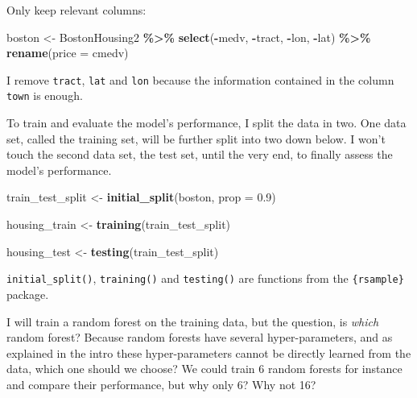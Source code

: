 \documentclass[
]{article}
\newenvironment{Shaded}{\begin{snugshade}}{\end{snugshade}}
\newcommand{\DataTypeTok}[1]{\textcolor[rgb]{0.13,0.29,0.53}{#1}}
\newcommand{\FloatTok}[1]{\textcolor[rgb]{0.00,0.00,0.81}{#1}}
\newcommand{\KeywordTok}[1]{\textcolor[rgb]{0.13,0.29,0.53}{\textbf{#1}}}
\newcommand{\NormalTok}[1]{#1}
\newcommand{\OperatorTok}[1]{\textcolor[rgb]{0.81,0.36,0.00}{\textbf{#1}}}
\newcommand{\StringTok}[1]{\textcolor[rgb]{0.31,0.60,0.02}{#1}}
\begin{document}
Only keep relevant columns:

\begin{Shaded}
\begin{Highlighting}[]
\NormalTok{boston \textless{}{-}}\StringTok{ }\NormalTok{BostonHousing2 }\OperatorTok{\%\textgreater{}\%}\StringTok{ }
\StringTok{    }\KeywordTok{select}\NormalTok{(}\OperatorTok{{-}}\NormalTok{medv, }\OperatorTok{{-}}\NormalTok{tract, }\OperatorTok{{-}}\NormalTok{lon, }\OperatorTok{{-}}\NormalTok{lat) }\OperatorTok{\%\textgreater{}\%}\StringTok{ }
\StringTok{    }\KeywordTok{rename}\NormalTok{(}\DataTypeTok{price =}\NormalTok{ cmedv)}
\end{Highlighting}
\end{Shaded}

I remove \texttt{tract}, \texttt{lat} and \texttt{lon} because the information contained in the column \texttt{town} is enough.

To train and evaluate the model's performance, I split the data in two.
One data set, called the training set, will be further split into two down below. I won't
touch the second data set, the test set, until the very end, to finally assess the model's
performance.

\begin{Shaded}
\begin{Highlighting}[]
\NormalTok{train\_test\_split \textless{}{-}}\StringTok{ }\KeywordTok{initial\_split}\NormalTok{(boston, }\DataTypeTok{prop =} \FloatTok{0.9}\NormalTok{)}

\NormalTok{housing\_train \textless{}{-}}\StringTok{ }\KeywordTok{training}\NormalTok{(train\_test\_split)}

\NormalTok{housing\_test \textless{}{-}}\StringTok{ }\KeywordTok{testing}\NormalTok{(train\_test\_split)}
\end{Highlighting}
\end{Shaded}

\texttt{initial\_split()}, \texttt{training()} and \texttt{testing()} are functions from the \texttt{\{rsample\}} package.

I will train a random forest on the training data, but the question, is \emph{which} random forest?
Because random forests have several hyper-parameters, and as explained in the intro these
hyper-parameters cannot be directly learned from the data, which one should we choose? We could
train 6 random forests for instance and compare their performance, but why only 6? Why not 16?
\end{document}
